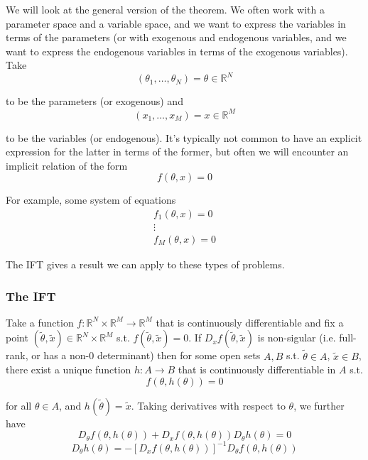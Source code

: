 \documentclass{article}
\begin{document}
We will look at the general version of the theorem. We often work with a parameter space and a variable space, and we  want to express the variables in terms of the parameters (or with exogenous and endogenous variables, and we want to express the endogenous variables in terms of the exogenous variables). Take
\[
  (\theta_1, \ldots, \theta_N) = \theta \in \mathbb{R}^N
\]

to be the parameters (or exogenous) and
\[
  (x_1, \ldots, x_M) = x \in \mathbb{R}^M
\]

to be the variables (or endogenous). It's typically not common to have an explicit expression for the latter in terms of the former, but often we will encounter an implicit relation of the form
\[
  f(\theta, x) = 0
\]

For example, some system of equations
\begin{equation}
  \begin{array}{c}
    f_1(\theta, x) = 0 \\
    \vdots \\
    f_M(\theta, x) = 0
  \end{array}
  \nonumber
\end{equation}

The IFT gives a result we can apply to these types of problems.

\subsubsection{The IFT}
\label{ssub:the_ift}

\begin{theorem}
  Take a function $f: \mathbb{R}^N \times \mathbb{R}^M \to \mathbb{R}^M$ that is continuously differentiable and fix a point $(\widetilde{\theta}, \widetilde{x}) \in \mathbb{R}^N \times \mathbb{R}^M$ s.t. $f(\widetilde{\theta}, \widetilde{x}) = 0$. If $D_x f(\widetilde{\theta}, \widetilde{x})$ is non-sigular (i.e. full-rank, or has a non-0 determinant) then for some open sets $A, B$ s.t. $\widetilde{\theta} \in A$, $\widetilde{x} \in B$, there exist a unique function $h: A \to B$ that is continuously differentiable in $A$ s.t.
  \[
    f(\theta, h(\theta)) = 0
  \]

  for all $\theta \in A$, and $h(\widetilde{\theta}) = \widetilde{x}$. Taking derivatives with respect to $\theta$, we further have
  \[
    D_\theta f(\theta, h(\theta)) + D_x f(\theta, h(\theta)) D_\theta h(\theta) = 0
  \]
  \[
    D_\theta h(\theta) = - \left[D_x f(\theta, h(\theta))\right]^{-1} D_\theta f(\theta, h(\theta))
  \]
\end{theorem}
\end{document}
